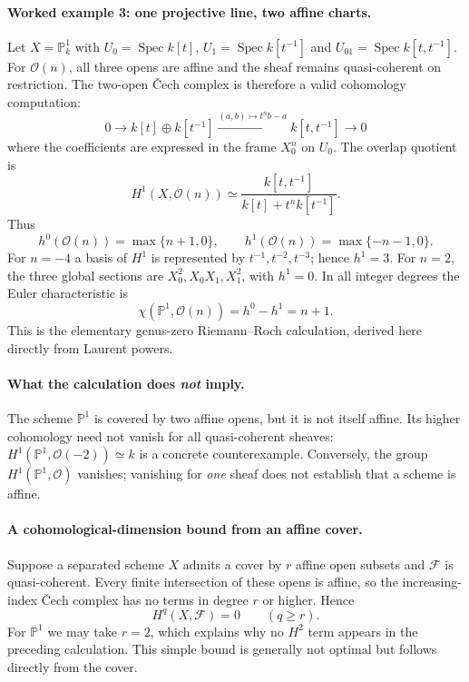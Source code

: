 \paragraph{Worked example 3: one projective line, two affine charts.}
Let $X=\mathbb P^1_k$ with
$U_0=\operatorname{Spec}k[t]$,
$U_1=\operatorname{Spec}k[t^{-1}]$ and
$U_{01}=\operatorname{Spec}k[t,t^{-1}]$.
For $\mathcal O(n)$, all three opens are affine and
the sheaf remains quasi-coherent on restriction.  The
two-open \v{C}ech complex is therefore a valid
cohomology computation:
\[
0\longrightarrow
 k[t]\oplus k[t^{-1}]
 \xrightarrow{(a,b)\mapsto t^n b-a}
 k[t,t^{-1}]
 \longrightarrow0
\]
where the coefficients are expressed in the frame
$X_0^n$ on $U_0$.  The overlap quotient is
\[
H^1(X,\mathcal O(n))\simeq
\frac{k[t,t^{-1}]}{k[t]+t^n k[t^{-1}]}.
\]
Thus
\[
 h^0(\mathcal O(n))=\max\{n+1,0\},\qquad
 h^1(\mathcal O(n))=\max\{-n-1,0\}.
\]
For $n=-4$ a basis of $H^1$ is represented by
$t^{-1},t^{-2},t^{-3}$; hence $h^1=3$.
For $n=2$, the three global sections are
$X_0^2,X_0X_1,X_1^2$, with $h^1=0$.
In all integer degrees the Euler characteristic is
\[
 \chi(\mathbb P^1,\mathcal O(n))
 =h^0-h^1=n+1.
\]
This is the elementary genus-zero Riemann--Roch
calculation, derived here directly from Laurent powers.

\paragraph{What the calculation does \emph{not} imply.}
The scheme $\mathbb P^1$ is covered by two affine opens,
but it is not itself affine.  Its higher cohomology need
not vanish for all quasi-coherent sheaves:
$H^1(\mathbb P^1,\mathcal O(-2))\simeq k$ is a concrete
counterexample.  Conversely, the group
$H^1(\mathbb P^1,\mathcal O)$ vanishes; vanishing for
\emph{one} sheaf does not establish that a scheme is affine.

\paragraph{A cohomological-dimension bound from an affine cover.}
Suppose a separated scheme $X$ admits a cover by $r$
affine open subsets and $\mathcal F$ is quasi-coherent.
Every finite intersection of these opens is affine,
so the increasing-index \v{C}ech complex has no terms
in degree $r$ or higher.  Hence
\[
H^q(X,\mathcal F)=0\qquad(q\geq r).
\]
For $\mathbb P^1$ we may take $r=2$, which explains
why no $H^2$ term appears in the preceding calculation.
This simple bound is generally not optimal but follows
directly from the cover.

